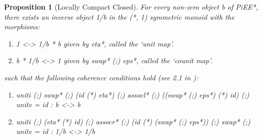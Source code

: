 \documentclass[preprint]{sigplanconf}
\newtheorem{proposition}[theorem]{Proposition}
\begin{document}
\begin{proposition}[Locally Compact Closed]
For every non-zero object {{b}} of {{PiEE*}}, there exists an inverse
object {{1/b}} in the {{(*, 1)}} symmetric monoid with the morphisms:

\begin{enumerate}
\item {{1 <-> 1/b * b}} given by {{eta*}}, called the `unit map'.
\item {{b * 1/b <-> 1}} given by {{swap* (;) eps*}}, called the `counit map'.
\end{enumerate}

\noindent
such that the following coherence conditions hold (see 2.1 in
\cite{selinger2007dagger}):


\begin{enumerate}
\item {{uniti (;) swap* (;) (id (*) eta*) (;) assocl* (;) ((swap* (;) eps*) (*) id) (;) unite = id : b <-> b}}
\item {{uniti (;) (eta* (*) id) (;) assocr* (;) (id (*) (swap* (;) eps*)) (;) swap* (;) unite = id : 1/b <-> 1/b}}


               

\end{enumerate}
\end{proposition}
\end{document}
